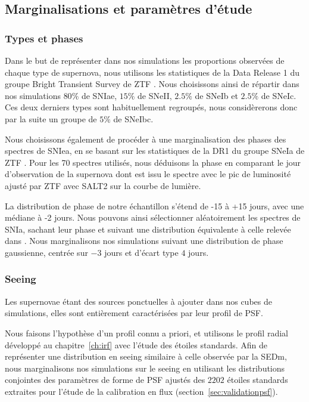 \documentclass[../main/main.tex]{subfiles}
\begin{document}
\subsection{Marginalisations et paramètres d'étude}

\subsubsection{Types et phases}

Dans le but de représenter dans nos simulations les proportions
observées de chaque
type de supernova, nous utilisons les statistiques de la Data
Release 1 du groupe Bright Transient Survey de ZTF
\citep[BTS;][]{FremlingZTFspec2020}.
Nous choisissons ainsi de répartir dans nos simulations $80\%$ de SNIae,
$15\%$ de SNeII, $2.5\%$ de SNeIb et $2.5\%$ de SNeIc. Ces deux derniers
types sont habituellement regroupés, nous considèrerons donc par la
suite un groupe de $5\%$ de SNeIbc.

Nous choisissons également de 
procéder à une marginalisation des phases des spectres de SNIea, en se
basant sur les statistiques de la
DR1 du groupe SNeIa de ZTF \citep{DhawanZTFDR1}. Pour
les 70 spectres utilisés, nous déduisons la phase en comparant le
jour d'observation de la supernova dont est issu le spectre avec le pic
de luminosité ajusté par ZTF avec SALT2
\citep{Guysalt2005,Guysalt22007,Guy2010,Betoule2014} sur la courbe de
lumière.

La distribution de phase de notre échantillon s'étend de -15 à
+15 jours, avec une médiane à -2 jours. Nous pouvons ainsi sélectionner
aléatoirement les spectres de SNIa, sachant leur phase et suivant une
distribution équivalente à celle relevée dans \citep{DhawanZTFDR1}. Nous marginalisons nos simulations suivant
une distribution de phase gaussienne, centrée sur $-3$ jours et d'écart
type $4$ jours.

\subsubsection{Seeing}

Les supernovae étant des sources ponctuelles à ajouter dans nos cubes
de simulations, elles sont entièrement caractérisées par leur profil de
PSF.

Nous faisons l'hypothèse d'un profil connu a priori, et
utilisons le profil radial développé au chapitre~\ref{ch:irf} avec
l'étude des étoiles standards. Afin de représenter une distribution en
seeing similaire à celle observée par la SEDm, nous marginalisons nos
simulations sur le seeing en utilisant les
distributions conjointes des paramètres de forme de PSF ajustés des $2202$
étoiles standards extraites pour l'étude de la calibration en
flux (section~\ref{sec:validationpsf}).
\end{document}
